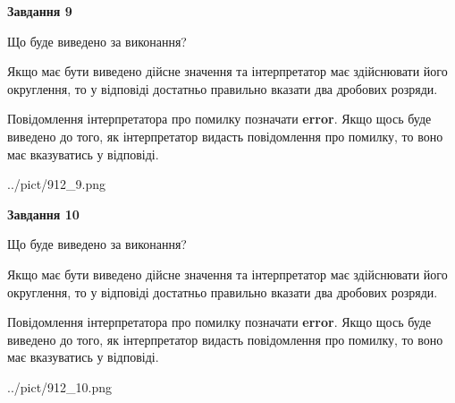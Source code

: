 \documentclass[12pt, ukrainian]{article}
\begin{document}
{\begin {Large}
{\begin {center}\textbf{Завдання 9}\end {center}}\par
Що буде виведено за виконання? \par

Якщо має бути виведено дійсне значення та інтерпретатор має здійснювати його округлення, 
то у відповіді достатньо правильно вказати два дробових розряди.

Повідомлення інтерпретатора про помилку позначати \textbf{error}.
Якщо щось буде виведено до того, як інтерпретатор видасть повідомлення про помилку, 
то воно має вказуватись у відповіді. \par

\begin{center}
	{../pict/912_9.png}
\end{center}
\newpage

{\begin {center}\textbf{Завдання 10}\end {center}}\par
Що буде виведено за виконання? \par

Якщо має бути виведено дійсне значення та інтерпретатор має здійснювати його округлення, 
то у відповіді достатньо правильно вказати два дробових розряди.

Повідомлення інтерпретатора про помилку позначати \textbf{error}.
Якщо щось буде виведено до того, як інтерпретатор видасть повідомлення про помилку, 
то воно має вказуватись у відповіді. \par

\begin{center}
	{../pict/912_10.png}
\end{center}
\newpage

\end {Large}}
\end{document}
